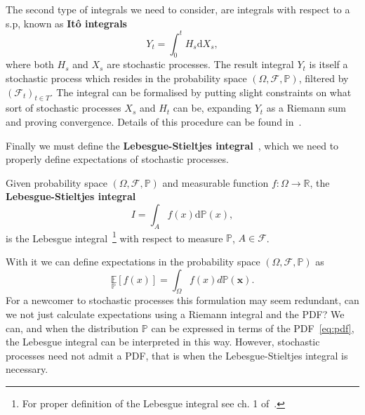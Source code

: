 The second type of integrals we need to consider, are integrals with respect to a s.p, known as \textbf{It\^ o integrals}
\begin{equation}
	\label{eq:ito}
	Y_t = \int_{0}^{t} H_s \mathrm{d}X_s,
\end{equation}
where both $H_s$ and $X_s$ are stochastic processes. The result integral $Y_t$ is itself a stochastic process which resides in the probability space $(\Omega, \mathcal{F}, \mathbb{P})$, filtered by $\left(\mathcal{F}_t\right)_{t\in T}$. The integral can be formalised by putting slight constraints on what sort of stochastic processes $X_s$ and $H_t$ can be, expanding $Y_t$ as a Riemann sum and proving convergence. Details of this procedure can be found in~\cite{rogers2000diffusions}.

Finally we must define the \textbf{Lebesgue-Stieltjes integral}~\cite{halmos2013measure}, which we need to properly define expectations of stochastic processes. 
\begin{definition}
		Given probability space $(\Omega, \mathcal{F}, \mathbb{P})$ and measurable function $f:\Omega \rightarrow \mathbb{R}$, the \textbf{Lebesgue-Stieltjes integral} 
		\begin{equation}
			I = \int_A f(x) \mathrm{d}\mathbb{P}(x),
		\end{equation}
		is the Lebesgue integral~\footnote{For proper definition of the Lebesgue integral see ch. 1 of~\cite{salamon2016measure}.} with respect to measure $\mathbb{P}$, $A \in \mathcal{F}$.
\end{definition}
With it we can define expectations in the probability space $(\Omega, \mathcal{F}, \mathbb{P})$ as
\begin{equation}
	\underset{{\mathbb{P}}}{\mathbb{E}}[f(x)]=\int_{\Omega} f(x) d \mathbb{P}(\boldsymbol{x}).
\end{equation}
For a newcomer to stochastic processes this formulation may seem redundant, can we not just calculate expectations using a Riemann integral and the PDF? We can, and when the distribution $\mathbb{P}$ can be expressed in terms of the PDF~\eqref{eq:pdf}, the Lebesgue integral can be interpreted in this way. However, stochastic processes need not admit a PDF, that is when the Lebesgue-Stieltjes integral is necessary.
